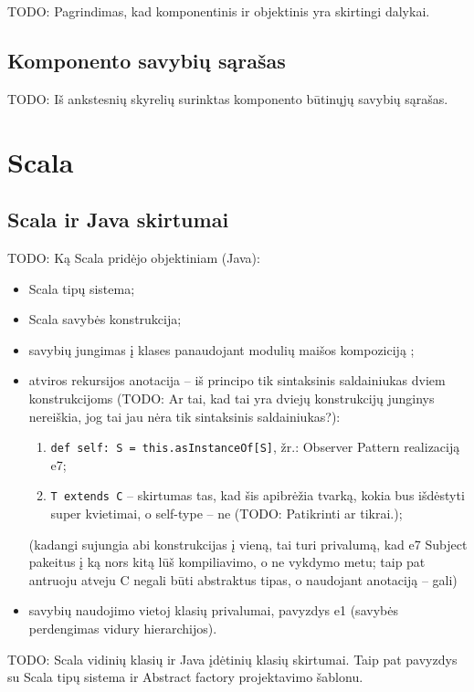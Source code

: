 TODO: Pagrindimas, kad komponentinis ir objektinis yra skirtingi
dalykai.

\section{Komponento savybių sąrašas}

TODO: Iš ankstesnių skyrelių surinktas komponento būtinųjų savybių
sąrašas.

\chapter{Scala}

\section{Scala ir Java skirtumai}

TODO: Ką Scala pridėjo objektiniam (Java):
\begin{itemize}
  \item Scala tipų sistema;
  \item Scala savybės  konstrukcija;
  \item savybių jungimas į klases panaudojant modulių maišos
    kompoziciją ;
  \item atviros rekursijos anotacija  –
    iš principo tik sintaksinis saldainiukas dviem konstrukcijoms
    (TODO: Ar tai, kad tai yra dviejų konstrukcijų junginys nereiškia,
    jog tai jau nėra tik sintaksinis saldainiukas?):
    \begin{enumerate}
      \item \verb|def self: S = this.asInstanceOf[S]|, žr.: Observer
        Pattern realizaciją e7;
      \item \verb|T extends C| – skirtumas tas, kad šis apibrėžia
        tvarką, kokia bus išdėstyti super kvietimai, o self-type
        – ne (TODO: Patikrinti ar tikrai.);
    \end{enumerate}
    (kadangi sujungia abi konstrukcijas į vieną, tai turi privalumą, kad
    e7 Subject pakeitus į ką nors kitą lūš kompiliavimo, o ne vykdymo
    metu; taip pat antruoju atveju C negali būti abstraktus tipas, o
    naudojant anotaciją – gali)
  \item savybių naudojimo vietoj klasių privalumai, pavyzdys e1
    (savybės perdengimas vidury hierarchijos).
\end{itemize}

TODO: Scala vidinių klasių ir Java įdėtinių klasių skirtumai. Taip pat
pavyzdys su Scala tipų sistema ir Abstract factory projektavimo šablonu.


